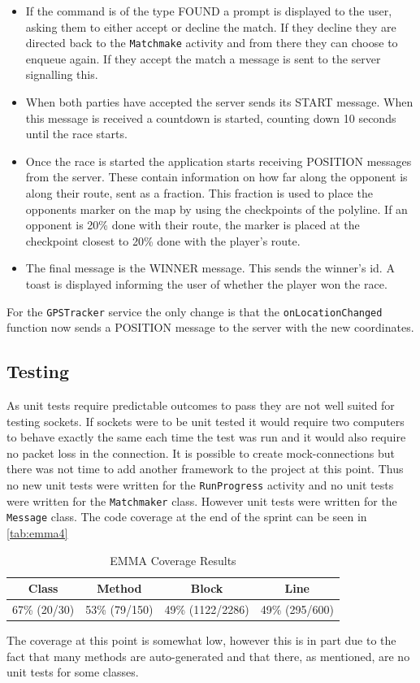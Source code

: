 \begin{itemize}
	\item{If the command is of the type FOUND a prompt is displayed to the user, asking them to either accept or decline the match. If they decline they are directed back to the \texttt{Matchmake} activity and from there they can choose to enqueue again. If they accept the match a message is sent to the server signalling this.}
	\item{When both parties have accepted the server sends its START message. When this message is received a countdown is started, counting down 10 seconds until the race starts.}
	\item{Once the race is started the application starts receiving POSITION messages from the server. These contain information on how far along the opponent is along their route, sent as a fraction. This fraction is used to place the opponents marker on the map by using the checkpoints of the polyline. If an opponent is 20\% done with their route, the marker is placed at the checkpoint closest to 20\% done with the player's route.}
	\item{The final message is the WINNER message. This sends the winner's id. A toast is displayed informing the user of whether the player won the race.}
\end{itemize}

For the \texttt{GPSTracker} service the only change is that the \texttt{on\-Location\-Changed} function now sends a POSITION message to the server with the new coordinates.

\subsection{Testing}
As unit tests require predictable outcomes to pass they are not well suited for testing sockets. If sockets were to be unit tested it would require two computers to behave exactly the same each time the test was run and it would also require no packet loss in the connection. It is possible to create mock-connections but there was not time to add another framework to the project at this point. Thus no new unit tests were written for the \texttt{RunProgress} activity and no unit tests were written for the \texttt{Matchmaker} class. However unit tests were written for the \texttt{Message} class.
The code coverage at the end of the sprint can be seen in \autoref{tab:emma4}

\begin{table}[!ht]
	\centering
	\begin{tabular}{| c | c | c | c |}
		\hline
		\textbf{Class} & \textbf{Method} & \textbf{Block} & \textbf{Line} \\ \hline
		67\% (20/30) & 53\% (79/150) & 49\% (1122/2286) & 49\% (295/600) \\
		\hline
	\end{tabular}
	\caption{EMMA Coverage Results}
	\label{tab:emma4}
\end{table}

The coverage at this point is somewhat low, however this is in part due to the fact that many methods are auto-generated and that there, as mentioned, are no unit tests for some classes.
